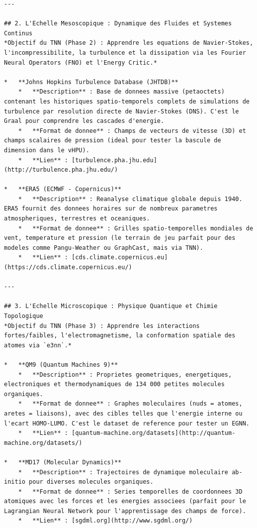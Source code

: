 \documentclass[11pt,a4paper]{article}
\begin{document}
\begin{lstlisting}[language={}, caption={}, basicstyle=\ttfamily\footnotesize, breaklines=true]
---

## 2. L'Echelle Mesoscopique : Dynamique des Fluides et Systemes Continus
*Objectif du TNN (Phase 2) : Apprendre les equations de Navier-Stokes, l'incompressibilite, la turbulence et la dissipation via les Fourier Neural Operators (FNO) et l'Energy Critic.*

*   **Johns Hopkins Turbulence Database (JHTDB)**
    *   **Description** : Base de donnees massive (petaoctets) contenant les historiques spatio-temporels complets de simulations de turbulence par resolution directe de Navier-Stokes (DNS). C'est le Graal pour comprendre les cascades d'energie.
    *   **Format de donnee** : Champs de vecteurs de vitesse (3D) et champs scalaires de pression (ideal pour tester la bascule de dimension dans le vHPU).
    *   **Lien** : [turbulence.pha.jhu.edu](http://turbulence.pha.jhu.edu/)

*   **ERA5 (ECMWF - Copernicus)**
    *   **Description** : Reanalyse climatique globale depuis 1940. ERA5 fournit des donnees horaires sur de nombreux parametres atmospheriques, terrestres et oceaniques.
    *   **Format de donnee** : Grilles spatio-temporelles mondiales de vent, temperature et pression (le terrain de jeu parfait pour des modeles comme Pangu-Weather ou GraphCast, mais via TNN).
    *   **Lien** : [cds.climate.copernicus.eu](https://cds.climate.copernicus.eu/)

---

## 3. L'Echelle Microscopique : Physique Quantique et Chimie Topologique
*Objectif du TNN (Phase 3) : Apprendre les interactions fortes/faibles, l'electromagnetisme, la conformation spatiale des atomes via `e3nn`.*

*   **QM9 (Quantum Machines 9)**
    *   **Description** : Proprietes geometriques, energetiques, electroniques et thermodynamiques de 134 000 petites molecules organiques.
    *   **Format de donnee** : Graphes moleculaires (nuds = atomes, aretes = liaisons), avec des cibles telles que l'energie interne ou l'ecart HOMO-LUMO. C'est le dataset de reference pour tester un EGNN.
    *   **Lien** : [quantum-machine.org/datasets](http://quantum-machine.org/datasets/)

*   **MD17 (Molecular Dynamics)**
    *   **Description** : Trajectoires de dynamique moleculaire ab-initio pour diverses molecules organiques.
    *   **Format de donnee** : Series temporelles de coordonnees 3D atomiques avec les forces et les energies associees (parfait pour le Lagrangian Neural Network pour l'apprentissage des champs de force).
    *   **Lien** : [sgdml.org](http://www.sgdml.org/)


\end{lstlisting}
\end{document}
